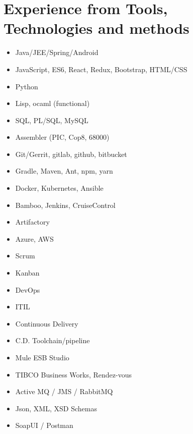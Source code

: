 \documentclass[11pt,a4paper,sans]{moderncv}        %
\begin{document}
\section{Experience from Tools, Technologies and methods}
\begin{cvcolumns}
        {\begin{itemize}
            \item Java/JEE/Spring/Android 
            \item  JavaScript, ES6, React, Redux, Bootstrap, HTML/CSS
            \item Python
            \item Lisp, ocaml  (functional)
            \item SQL, PL/SQL, MySQL 
            \item Assembler (PIC, Cop8, 68000) 
        \end{itemize}}
	{\begin{itemize}
        \item Git/Gerrit, gitlab, github, bitbucket 
        \item Gradle, Maven, Ant, npm, yarn
        \item Docker, Kubernetes, Ansible
        \item Bamboo, Jenkins, CruiseControl 
        \item Artifactory
        \item Azure, AWS 
    \end{itemize}}
\end{cvcolumns} 
\begin{cvcolumns}
	{\begin{itemize}
            \item Scrum
            \item Kanban
            \item DevOps
            \item ITIL
            \item Continuous Delivery 
            \item C.D. Toolchain/pipeline 
    \end{itemize}}
    	{\begin{itemize}
                \item Mule ESB Studio
                \item TIBCO Business Works, Rendez-vous 
                \item Active MQ / JMS / RabbitMQ 
                \item Json, XML, XSD Schemas 
                \item SoapUI / Postman
        \end{itemize}}
\end{cvcolumns} 
\end{document}
